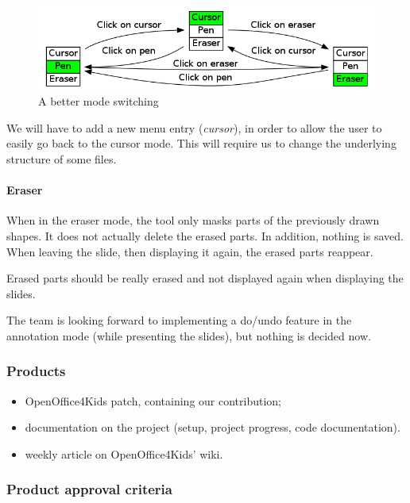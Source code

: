\documentclass[a4paper,11pt]{article}
\begin{document}
\begin{figure}[!h]
\centering
\includegraphics[scale=0.5]{images/modes.png}
\caption{A better mode switching}
\end{figure}

We will have to add a new menu entry (\emph{cursor}), in order to allow the
user to easily go back to the cursor mode. This will require us to change the
underlying structure of some files.

\paragraph*{Eraser}

When in the eraser mode, the tool only masks parts of the previously drawn
shapes. It does not actually delete the erased parts. In addition, nothing is
saved. When leaving the slide, then displaying it again, the erased parts
reappear.

Erased parts should be really erased and not displayed again when displaying
the slides.

The team is looking forward to implementing a do/undo feature in the
annotation mode (while presenting the slides), but nothing is decided now.

\subsubsection*{Products}

\begin{itemize}
\item OpenOffice4Kids patch, containing our contribution;
\item documentation on the project (setup, project progress, code documentation).
\item weekly article on OpenOffice4Kids' wiki.
\end{itemize}


\subsubsection*{Product approval criteria}
\end{document}
